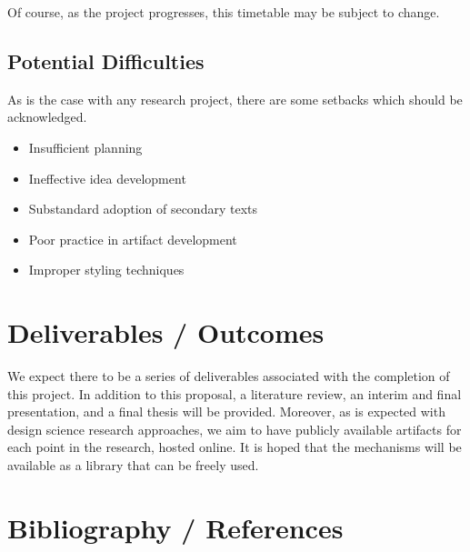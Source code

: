 \documentclass[12pt, a4paper]{article}
\begin{document}
Of course, as the project progresses, this timetable may be subject to change.

\subsection{Potential Difficulties}
As is the case with any research project, there are some setbacks which should be acknowledged.
\begin{itemize}
  \item Insufficient planning
  \item Ineffective idea development
  \item Substandard adoption of secondary texts
  \item Poor practice in artifact development
  \item Improper styling techniques
\end{itemize}

\section{Deliverables / Outcomes}
We expect there to be a series of deliverables associated with the completion of this project. In addition to this proposal, a literature review, an interim and final presentation, and a final thesis will be provided. Moreover, as is expected with design science research approaches, we aim to have publicly available artifacts for each point in the research, hosted online. It is hoped that the mechanisms will be available as a library that can be freely used.

\section{Bibliography / References}


\end{document}
